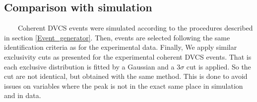\subsection{Comparison with simulation}
~~~~Coherent DVCS events were simulated according to the procedures described 
in section \ref{Event_generator}. Then, events are selected following the same 
identification criteria as for the experimental data. Finally, We apply similar 
exclusivity cuts as presented for the experimental coherent DVCS events. That 
is each exclusive distribution is fitted by a Gaussian and a 3$\sigma$ cut is 
applied. So the cut are not identical, but obtained with the same method. This 
is done to avoid issues on variables where the peak is not in the exact same 
place in simulation and in data.\\

